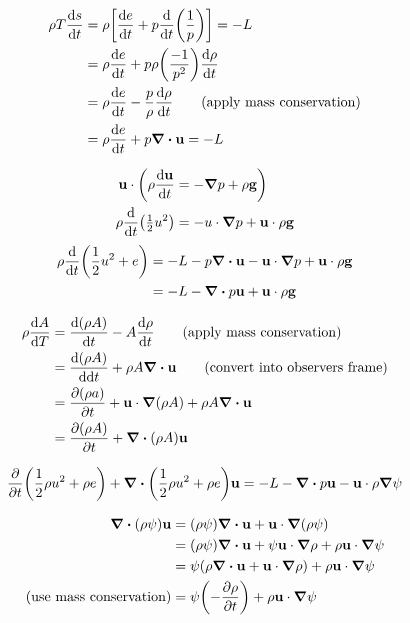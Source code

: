 \documentclass[10pt, a4paper, twocolumn]{article}
\begin{document}
\begin{equation*}
\begin{aligned}
\rho T\dv{s}{t}
&=\rho\bqty{\dv{e}{t}
+p\dv{t}\pqty{\frac1p}}=-L
\\&=\rho\dv{e}{t}+p\rho
\pqty{\frac{-1}{p^2}}\dv{\rho}{t}
\\&=\rho\dv{e}{t}
-\frac{p}{\rho}\dv{\rho}{t}
\qquad \text{(apply mass conservation)}
\\&=\rho\dv{e}{t}+p\div{\vb u}=-L
\end{aligned}
\end{equation*}

\begin{equation*}
\begin{aligned}
\vb u\cdot \bigg(\rho\dv{\vb u}{t}
&=-\grad{p}+\rho\vb g\bigg)
\\ \rho\dv{t}\pqty{\tfrac12 u^2}
&=-u\cdot\grad p+\vb u\cdot \rho\vb g
\end{aligned}
\end{equation*}
\begin{equation*}
\begin{aligned}
\rho\dv{t}\pqty{\frac12 u^2+e}
&=-L-p\div\vb u-\vb u\cdot\grad p
+\vb u\cdot \rho \vb g
\\&=-L-\div p\vb u
+\vb u \cdot\rho\vb g
\end{aligned}
\end{equation*}

\begin{equation*}
\begin{aligned}
\rho\dv{A}{T}
&=\dv{(\rho A)}{t}-A\dv{\rho}{t}
\qquad\text{(apply mass conservation)}
\\&=\dv{(\rho A)}{\dd t}
+\rho A\div{\vb u}
\qquad\text{(convert into observers frame)}
\\&=\pdv{(\rho a)}{t}
+\vb u\cdot \grad{(\rho A)}
+\rho A\div{\vb u}
\\&=\pdv{(\rho A)}{t}+\div{(\rho A)}\vb u
\end{aligned}
\end{equation*}

\[\pdv{t}
\pqty{\frac12 \rho u^2+\rho e}
+\div{
\pqty{\frac12 \rho u^2+\rho e}
}\vb u
=-L-\div{p\vb u}-\vb u\cdot \rho\grad \psi
\]

\begin{equation*}
\begin{aligned}
\div{(\rho \psi)\vb u}
&=(\rho \psi )\div \vb u
+\vb u\cdot\grad{(\rho \psi)}
\\&=(\rho \psi)\div \vb u
+\psi \vb u\cdot \grad\rho
+\rho \vb u\cdot \grad \psi
\\&=\psi(\rho \div \vb u+\vb u\cdot \grad\rho)
+\rho \vb u \cdot\grad\psi
\\ \text{(use mass conservation)}
&=\psi\pqty{-\pdv{\rho}{t}}
+\rho \vb u\cdot\grad\psi
\end{aligned}
\end{equation*}
\end{document}
